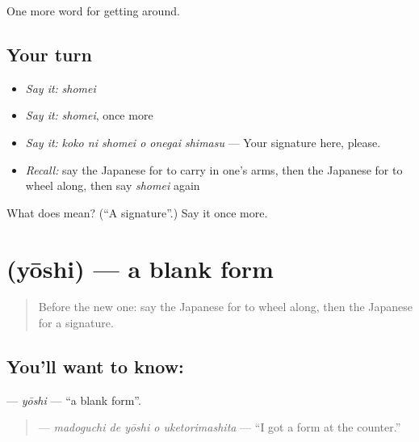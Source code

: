 \begin{grammarlens}[title={What you've built}]
One more word for getting around.
\end{grammarlens}

\subsection*{Your turn}
\begin{itemize}
\raggedright
  \item \emph{Say it:} \emph{shomei}
  \item \emph{Say it:} \emph{shomei}, once more
  \item \emph{Say it:} \emph{koko ni shomei o onegai shimasu} — Your signature here, please.
  \item \emph{Recall:} say the Japanese for to carry in one's arms, then the Japanese for to wheel along, then say \emph{shomei} again
\end{itemize}

\begin{tcolorbox}[breakable,colback=teal!4,colframe=teal!35!black,title={Before you move on}]
What does  mean? (\textquotedblleft{}A signature\textquotedblright{}.) Say it once more.
\end{tcolorbox}
\section[\texorpdfstring{\ja{ようし} (yōshi)}{ようし (yōshi)}]{ (yōshi) — a blank form}

\label{lesson:JA-C418-youshi}



\begin{quote}
Before the new one: say the Japanese for to wheel along, then the Japanese for a signature.
\end{quote}

\subsection*{You'll want to know: }
\textbf{} — \emph{yōshi} — \textquotedblleft{}a blank form\textquotedblright{}.

\begin{quote}
\textbf{  } — \emph{madoguchi de yōshi o uketorimashita} — \textquotedblleft{}I got a form at the counter.\textquotedblright{}
\end{quote}

